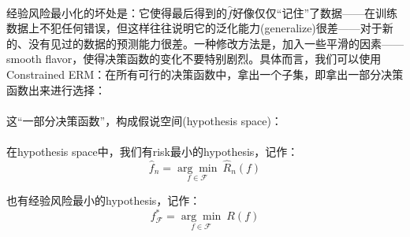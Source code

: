 \documentclass[a4paper]{article}
\begin{document}
	\noindent{}\\
	
	经验风险最小化的坏处是：它使得最后得到的$\hat{f}$好像仅仅“记住”了数据——在训练数据上不犯任何错误，但这样往往说明它的泛化能力(generalize)很差——对于新的、没有见过的数据的预测能力很差。一种修改方法是，加入一些平滑的因素——smooth flavor，使得决策函数的变化不要特别剧烈。具体而言，我们可以使用Constrained ERM：在所有可行的决策函数中，拿出一个子集，即拿出一部分决策函数出来进行选择：\\

	\noindent{}\\
	
	这“一部分决策函数”，构成假说空间(hypothesis space)：\\

	\noindent{}\\
	
	在hypothesis space中，我们有risk最小的hypothesis，记作：
	$$
	\hat{f}_n = \underset{f \in \mathcal{F}}{\arg\min}\ \hat{R}_n(f)
	$$
	
	也有经验风险最小的hypothesis，记作：
	$$
	f^*_{\mathcal{F}} = \underset{f \in \mathcal{F}}{\arg\min}\ R(f)
	$$
\end{document}
